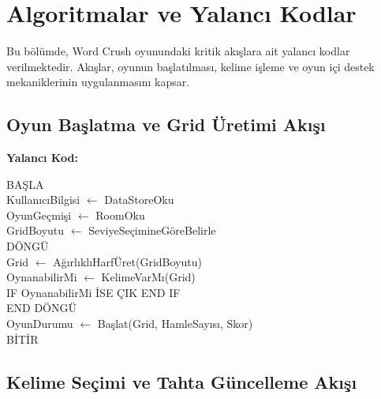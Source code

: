 \documentclass[conference]{IEEEtran}
\begin{document}
\section{Algoritmalar ve Yalancı Kodlar}

Bu bölümde, Word Crush oyunundaki kritik akışlara ait yalancı kodlar
verilmektedir. Akışlar, oyunun başlatılması, kelime işleme
ve oyun içi destek mekaniklerinin uygulanmasını kapsar.

\subsection{Oyun Başlatma ve Grid Üretimi Akışı}

\noindent\textbf{Yalancı Kod:}
\begin{flushleft}
\ttfamily
BAŞLA \\
KullanıcıBilgisi $\leftarrow$ DataStoreOku \\
OyunGeçmişi $\leftarrow$ RoomOku \\
GridBoyutu $\leftarrow$ SeviyeSeçimineGöreBelirle \\
DÖNGÜ \\
\hspace*{1em} Grid $\leftarrow$ AğırlıklıHarfÜret(GridBoyutu) \\
\hspace*{1em} OynanabilirMi $\leftarrow$ KelimeVarMı(Grid) \\
\hspace*{1em} IF OynanabilirMi İSE ÇIK END IF \\
END DÖNGÜ \\
OyunDurumu $\leftarrow$ Başlat(Grid, HamleSayısı, Skor) \\
BİTİR
\end{flushleft}
\normalfont

\subsection{Kelime Seçimi ve Tahta Güncelleme Akışı}
\end{document}
